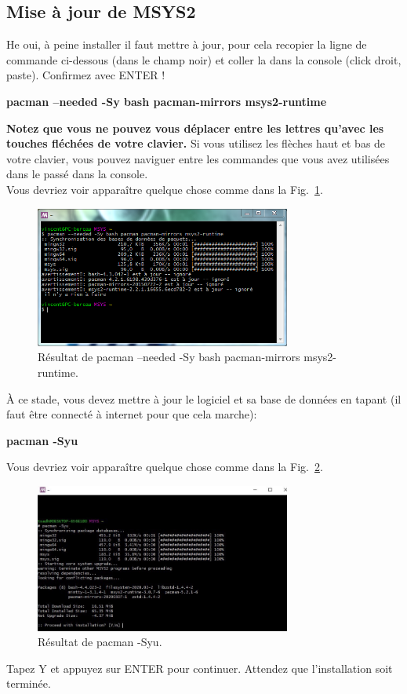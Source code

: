 \documentclass{article}
\newcommand\fig[1]{{Fig.~\ref{#1}}}
\begin{document}
\subsection{Mise à jour de MSYS2}
 He oui, à peine installer il faut mettre à jour, pour cela recopier la ligne de commande ci-dessous (dans le champ noir) et coller la dans la console (click droit, paste). Confirmez avec ENTER !
\begin{tcolorbox}[width=\textwidth,colframe=Purple,colback={black},title={Ceci est la console MSYS2 Shell},outer arc=0mm,colupper=white]    
      \large\textbf{pacman --needed -Sy bash pacman-mirrors msys2-runtime}
\end{tcolorbox}
\textbf{Notez que vous ne pouvez vous déplacer entre les lettres qu'avec les touches fléchées de votre clavier. } Si vous utilisez les flèches haut et bas de votre clavier, vous pouvez naviguer entre les commandes que vous avez utilisées dans le passé dans la console.\\
Vous devriez voir apparaître quelque chose comme dans la \fig{F:firstPaxman}.
\begin{figure}[H]
\center
\includegraphics[width=0.75\textwidth]{Plots/Msys2_7Terminal.png}
\caption{Résultat de pacman --needed -Sy bash pacman-mirrors msys2-runtime.\label{F:firstPaxman}}
\end{figure}
À ce stade, vous devez mettre à jour le logiciel et sa base de données en tapant (il faut être connecté à internet pour que cela marche):
\begin{tcolorbox}[width=\textwidth,colframe=Purple,colback={black},title={Ceci est la console MSYS2 Shell},outer arc=0mm,colupper=white]    
      \large\textbf{pacman -Syu}
\end{tcolorbox}
Vous devriez voir apparaître quelque chose comme dans la \fig{F:2Paxman}.
\begin{figure}[H]
\center
\includegraphics[width=0.75\textwidth]{Plots/Msys2_8Terminal.jpeg}
\caption{Résultat de pacman -Syu.\label{F:2Paxman}}
\end{figure}
Tapez Y et appuyez sur ENTER pour continuer. Attendez que l'installation soit terminée. 
\end{document}
